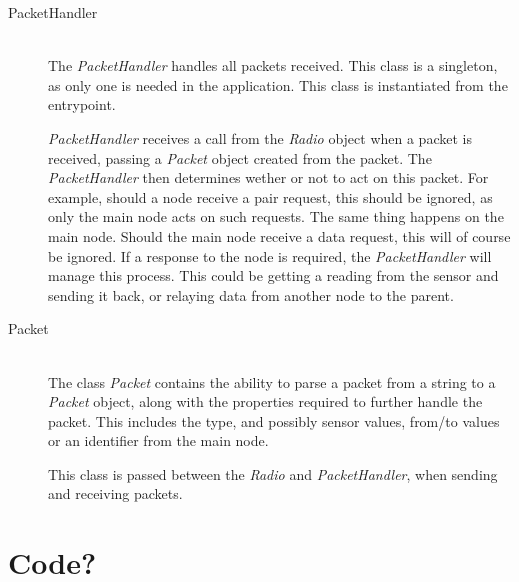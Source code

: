 \begin{description}
\item[PacketHandler] \hfill \\
The \textit{PacketHandler} handles all packets received. This class is a singleton, as only one is needed in the application. This class is instantiated from the entrypoint.

\textit{PacketHandler} receives a call from the \textit{Radio} object when a packet is received, passing a \textit{Packet} object created from the packet. The \textit{PacketHandler} then determines wether or not to act on this packet. 
For example, should a node receive a pair request, this should be ignored, as only the main node acts on such requests. The same thing happens on the main node. Should the main node receive a data request, this will of course be ignored.
If a response to the node is required, the \textit{PacketHandler} will manage this process. This could be getting a reading from the sensor and sending it back, or relaying data from another node to the parent.

\item[Packet] \hfill \\
The class \textit{Packet} contains the ability to parse a packet from a string to a \textit{Packet} object, along with the properties required to further handle the packet. This includes the type, and possibly sensor values, from/to values or an identifier from the main node.

This class is passed between the \textit{Radio} and \textit{PacketHandler}, when sending and receiving packets.

\end{description}


\section{Code?}